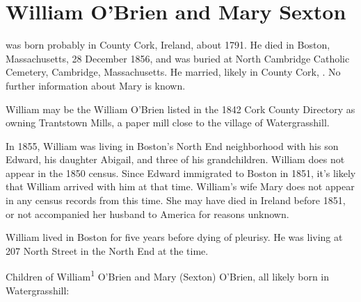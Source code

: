\section{William O'Brien and Mary Sexton}

 was born probably in County Cork, Ireland, about 1791.\cite{Census1855William} He died in Boston, Massachusetts, 28 December 1856,\cite{William1OBrienDeath} and was buried at North Cambridge Catholic Cemetery, Cambridge, Massachusetts.\cite{DianaBerberenaLetter1} He married, likely in County Cork, .\cite{Michael2OBrienDeath,Abigail2OBrienDeath,Ann2OBrienDeath,Mary2OBrienDeath} No further information about Mary is known.

William may be the William O'Brien listed in the 1842 Cork County Directory as owning Trantstown Mills, a paper mill close to the village of Watergrasshill.\cite{Jacksons}

In 1855, William was living in Boston's North End neighborhood with his son Edward, his daughter Abigail, and three of his grandchildren.\cite{Census1855William,Wards} William does not appear in the 1850 census. Since Edward immigrated to Boston in 1851,\cite{Edward2OBrienNaturalization} it's likely that William arrived with him at that time. William's wife Mary does not appear in any census records from this time. She may have died in Ireland before 1851, or not accompanied her husband to America for reasons unknown.

William lived in Boston for five years before dying of pleurisy. He was living at 207 North Street in the North End at the time.\cite{William1OBrienDeath}

\begin{KidsIntro}
	Children of William\textsuperscript{1} O'Brien and Mary (Sexton) O'Brien, all likely born in Watergrasshill:
\end{KidsIntro}

